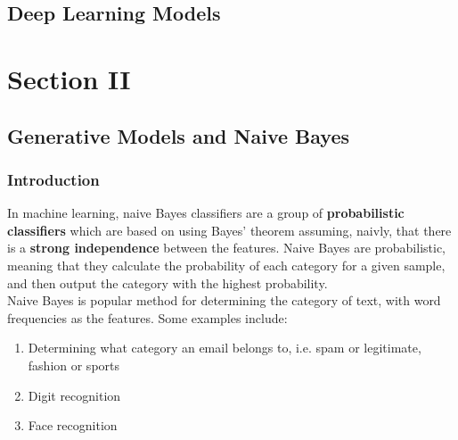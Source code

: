 \documentclass[11pt,fleqn]{book} %
\begin{document}


\chapter{Deep Learning Models}


\part{Section II}



\chapter{Generative Models and Naive Bayes}

\section*{Introduction}
In machine learning, naive Bayes classifiers are a group of \textbf{probabilistic classifiers} which are based on using Bayes’ theorem assuming, naivly, that there is a \textbf{strong independence} between the features. Naive Bayes are probabilistic, meaning that they calculate the probability of each category for a given sample, and then output the category with the highest probability.\\

\noindent
Naive Bayes is popular method for determining the category of text, with word frequencies as the features. Some examples include: \\
\begin{enumerate}
	\item Determining what category an email belongs to, i.e. spam or legitimate, fashion or sports
	\item Digit recognition
	\item Face recognition
\end{enumerate}
\end{document}
